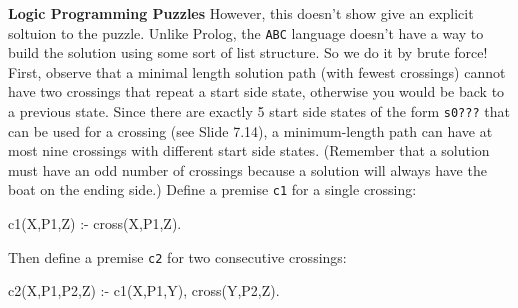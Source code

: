 \begin{minipage}[t]{\sw}
\slidenumber
\LARGE
{\bf Logic Programming Puzzles}\exx
However, this doesn't show give an explicit soltuion to the puzzle.
Unlike Prolog, the \verb'ABC' language doesn't have a way to build
the solution using some sort of list structure.
So we do it by brute force!\exx
First, observe that a minimal length solution path
(with fewest crossings)
cannot have two crossings
that repeat a start side state,
otherwise you would be back to a previous state.
Since there are exactly 5 start side states of the form \verb's0???'
that can be used for a crossing
(see Slide 7.14),
a minimum-length path can have
at most nine crossings with different start side states.
(Remember that a solution must have an odd number of crossings
because a solution will always have the boat on the ending side.)\exx
Define a premise \verb'c1' for a single crossing:
\begin{qv}
c1(X,P1,Z) :- cross(X,P1,Z). %
\end{qv}
Then define a premise \verb'c2' for two consecutive crossings:
\begin{qv}
c2(X,P1,P2,Z) :- c1(X,P1,Y), cross(Y,P2,Z). %
\end{qv}
\end{minipage}
